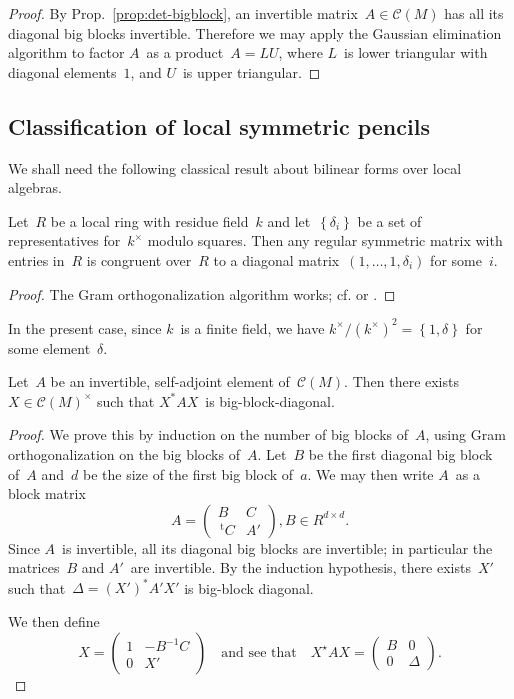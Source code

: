 \documentclass{lms}%
\let\ro\mathscr
\def\transpose{\,{}^{\mathrm{t}\!}}
\def\acco#1{\left\{#1\right\}}
\def\mat#1{\begin{pmatrix}#1\end{pmatrix}}
\begin{document}
\begin{proof}
By Prop.~\ref{prop:det-bigblock}, an invertible matrix~$A ∈ \ro C(M)$ has
all its diagonal big blocks invertible. Therefore we may apply the
Gaussian elimination algorithm to factor $A$~as a product~$A = LU$, where
$L$~is lower triangular with diagonal elements~$1$, and $U$~is upper
triangular.
\end{proof}%

\subsection{Classification of local symmetric pencils}%

We shall need the following classical result about bilinear forms over
local algebras.

\begin{prop}\label{prop:local-diag}%
Let~$R$ be a local ring with residue field~$k$ and let~$\acco{δ_i}$ be a
set of representatives for~$k^{×}$ modulo squares. Then any regular
symmetric matrix with entries in~$R$ is congruent over~$R$ to a
diagonal matrix~$(1, …, 1, δ_i)$ for some~$i$.
\end{prop}

\begin{proof}
The Gram orthogonalization algorithm works; cf.
\cite[I(3.4)]{milnorhusemoller} or \cite[92:1]{omeara}.
\end{proof}

In the present case, since $k$~is a finite field, we have $k^{×} /
(k^{×})^2 = \acco {1, δ}$ for some element~$δ$.
\begin{prop}\label{prop:bb-diag}%
Let~$A$ be an invertible, self-adjoint element of~$\ro C(M)$. Then there
exists $X ∈ \ro C(M)^{×}$ such that $X^{*} A X$~is big-block-diagonal.
\end{prop}

\begin{proof}
We prove this by induction on the number of big blocks of~$A$, using Gram
orthogonalization on the big blocks of~$A$. Let~$B$ be the first diagonal
big block of~$A$ and~$d$ be the size of the first big block of~$a$.
We may then write $A$~as a block matrix
\begin{equation}
A = \mat{B & C \\ \transpose{C} & A'}, B ∈ R^{d×d}.
\end{equation}
Since $A$~is invertible, all its diagonal big blocks are invertible; in
particular the matrices~$B$ and $A'$~are invertible. By the induction
hypothesis, there exists~$X'$ such that~$Δ = (X')^{*} A' X'$ is
big-block diagonal.

We then define
\begin{equation}
X = \mat{1 & -B^{-1} C\\0 & X'}\quad\text{and see that}\quad
X^{⋆} A X = \mat{B & 0\\0 & Δ}.
\end{equation}
\end{proof}
\end{document}
